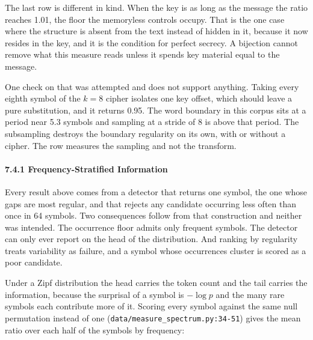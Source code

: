 The last row is different in kind. When the key is as long as the message the ratio reaches 1.01, the floor the memoryless controls occupy. That is the one case where the structure is absent from the text instead of hidden in it, because it now resides in the key, and it is the condition for perfect secrecy. A bijection cannot remove what this measure reads unless it spends key material equal to the message.

One check on that was attempted and does not support anything. Taking every eighth symbol of the \(k = 8\) cipher isolates one key offset, which should leave a pure substitution, and it returns 0.95. The word boundary in this corpus sits at a period near 5.3 symbols and sampling at a stride of 8 is above that period. The subsampling destroys the boundary regularity on its own, with or without a cipher. The row measures the sampling and not the transform.

\paragraph{7.4.1 Frequency-Stratified Information}

Every result above comes from a detector that returns one symbol, the one whose gaps are most regular, and that rejects any candidate occurring less often than once in 64 symbols. Two consequences follow from that construction and neither was intended. The occurrence floor admits only frequent symbols. The detector can only ever report on the head of the distribution. And ranking by regularity treats variability as failure, and a symbol whose occurrences cluster is scored as a poor candidate.

Under a Zipf distribution the head carries the token count and the tail carries the information, because the surprisal of a symbol is \(-\log p\) and the many rare symbols each contribute more of it. Scoring every symbol against the same null permutation instead of one (\texttt{data/\allowbreak{}measure\_\allowbreak{}spectrum.\allowbreak{}py:34-\allowbreak{}51}) gives the mean ratio over each half of the symbols by frequency:


